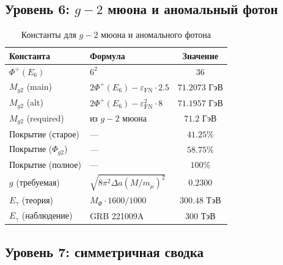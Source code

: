 \documentclass[11pt,a4paper]{article}
\theoremstyle{definition}
\begin{document}
\subsection{Уровень 6: \texorpdfstring{$g-2$}{g-2} мюона и аномальный фотон}
\label{app:level-6-g2}

\begin{table}[ht]
\centering
\caption{\texorpdfstring{Константы для $g-2$ мюона и аномального фотона}{Константы для g-2 мюона и аномального фотона}}
\label{tab:app-g2}
\begin{tabular}{llc}
\toprule
Константа & Формула & Значение \\
\midrule
$\Phi^+(E_6)$ & $6^2$ & $36$ \\
$M_{g2}$ (main) & $2\Phi^+(E_6) - \varepsilon_{\text{FN}} \cdot 2.5$ & $71.2073$ ГэВ \\
$M_{g2}$ (alt) & $2\Phi^+(E_6) - \varepsilon_{\text{FN}}^2 \cdot 8$ & $71.1957$ ГэВ \\
$M_{g2}$ (required) & из $g-2$ мюона & $71.2$ ГэВ \\
Покрытие (старое) & — & $41.25\%$ \\
Покрытие ($\Phi_{g2}$) & — & $58.75\%$ \\
Покрытие (полное) & — & $100\%$ \\
$g$ (требуемая) & $\sqrt{8\pi^2 \Delta a (M/m_\mu)^2}$ & $0.2300$ \\
\midrule
$E_\gamma$ (теория) & $M_\Phi \cdot 1600/1000$ & $300.48$ ТэВ \\
$E_\gamma$ (наблюдение) & GRB 221009A & $300$ ТэВ \\
\bottomrule
\end{tabular}
\end{table}

\subsection{Уровень 7: симметричная сводка}
\label{app:level-7-summary}
\end{document}
